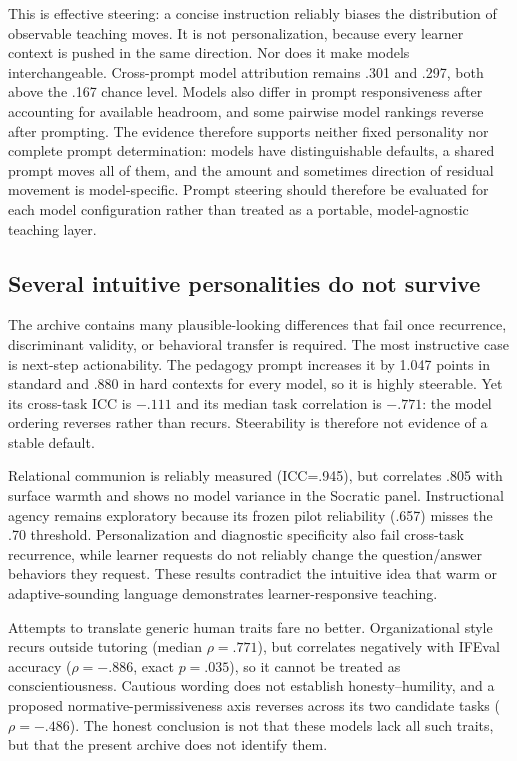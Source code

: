 \documentclass[11pt]{article}
\begin{document}
This is effective steering: a concise instruction reliably biases the
distribution of observable teaching moves. It is not personalization, because
every learner context is pushed in the same direction. Nor does it make models
interchangeable. Cross-prompt model
attribution remains .301 and .297, both above the .167 chance level. Models also
differ in prompt responsiveness after accounting for available headroom, and
some pairwise model rankings reverse after prompting. The evidence therefore
supports neither fixed personality nor complete prompt determination: models
have distinguishable defaults, a shared prompt moves all of them, and the amount
and sometimes direction of residual movement is model-specific. Prompt steering
should therefore be evaluated for each model configuration rather than treated
as a portable, model-agnostic teaching layer.

\subsection{Several intuitive personalities do not survive}

The archive contains many plausible-looking differences that fail once
recurrence, discriminant validity, or behavioral transfer is required. The most
instructive case is next-step actionability. The pedagogy prompt increases it by
1.047 points in standard and .880 in hard contexts for every model, so it is
highly steerable. Yet its cross-task ICC is $-.111$ and its median task
correlation is $-.771$: the model ordering reverses rather than recurs.
Steerability is therefore not evidence of a stable default.

Relational communion is reliably measured (ICC=.945), but correlates .805 with
surface warmth and shows no model variance in the Socratic panel. Instructional
agency remains exploratory because its frozen pilot reliability (.657) misses
the .70 threshold. Personalization and diagnostic specificity also fail
cross-task recurrence, while learner requests do not reliably change the
question/answer behaviors they request. These results contradict the intuitive
idea that warm or adaptive-sounding language demonstrates learner-responsive
teaching.

Attempts to translate generic human traits fare no better. Organizational style
recurs outside tutoring (median $\rho=.771$), but correlates negatively with
IFEval accuracy ($\rho=-.886$, exact $p=.035$), so it cannot be treated as
conscientiousness. Cautious wording does not establish honesty--humility, and a
proposed normative-permissiveness axis reverses across its two candidate tasks
($\rho=-.486$). The honest conclusion is not that these models lack all such
traits, but that the present archive does not identify them.
\end{document}
